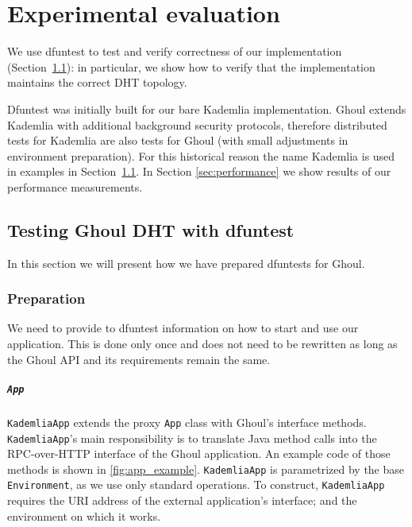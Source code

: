 \chapter{Experimental evaluation}
\label{ch:evaluation}

We use dfuntest to test and verify correctness of our implementation
(Section~\ref{sec:exampl-test-kademl}): in particular, we show how to verify
that the implementation maintains the correct DHT topology.

Dfuntest was initially built for our bare Kademlia implementation.
Ghoul extends Kademlia with additional background security protocols, therefore distributed tests for Kademlia are also tests for Ghoul (with small adjustments in environment preparation).
For this historical reason the name Kademlia is used in examples in
Section~\ref{sec:exampl-test-kademl}.
In Section \ref{sec:performance} we show results of our performance
measurements.
\section{Testing Ghoul DHT with dfuntest}
\label{sec:exampl-test-kademl}
In this section we will present how we have prepared dfuntests for Ghoul.

\subsection{Preparation}
We need to provide to dfuntest information on how to start and use our
application. This is done only once and does not need to be rewritten as long as
the Ghoul API and its requirements remain the same.

\paragraph{\texttt{App}} 
\texttt{KademliaApp} extends the proxy \texttt{App} class with Ghoul's interface methods.
\texttt{KademliaApp}'s main responsibility is to translate Java method calls into the RPC-over-HTTP interface of the Ghoul application.
An example code of those methods is shown in \ref{fig:app_example}.
\texttt{KademliaApp} is parametrized by the base \texttt{Environment}, as we use only standard operations.
To construct, \texttt{KademliaApp} requires the URI address of the external
application's interface; and the environment on which it works.

